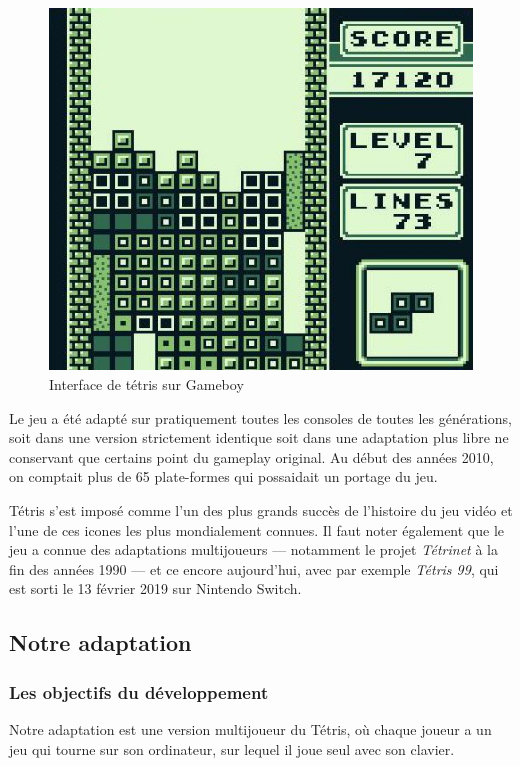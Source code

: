 \documentclass[a4paper, 12pt]{article}
\begin{document}
		\begin{figure}[b]
			\centering
			\includegraphics[scale=0.3]{img/Tetris8.jpg}
			\caption{Interface de tétris sur Gameboy}
			\label{fig:tetris}
		\end{figure}
		

		Le jeu a été adapté sur pratiquement toutes les consoles de toutes les générations, soit dans une version strictement identique soit dans une adaptation plus libre ne conservant que certains point du gameplay original. Au début des années 2010, on comptait plus de 65 plate-formes qui possaidait un portage du jeu.

		Tétris s'est imposé comme l'un des plus grands succès de l'histoire du jeu vidéo et l'une de ces icones les plus mondialement connues. Il faut noter également que le jeu a connue des adaptations multijoueurs --- notamment le projet \emph{Tétrinet} à la fin des années 1990 --- et ce encore aujourd'hui, avec par exemple \emph{Tétris 99}, qui est sorti le 13 février 2019 sur Nintendo Switch.

	\subsection{Notre adaptation}
		\subsubsection{Les objectifs du développement}
			Notre adaptation est une version multijoueur du Tétris, où chaque joueur a un jeu qui tourne sur son ordinateur, sur lequel il joue seul avec son clavier. 
\end{document}
